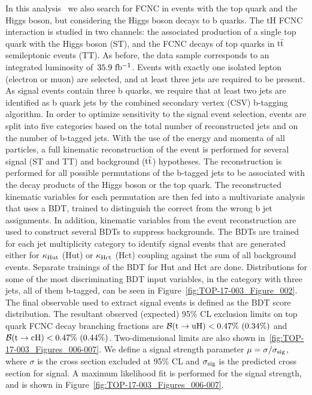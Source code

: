 \documentclass{PoS}
\begin{document}
In this analysis~\cite{top-17-003} we also search for FCNC in events with the
top quark and the Higgs boson, but considering the Higgs boson decays to b
quarks. The tH FCNC interaction is studied in two channels: the associated
production of a single top quark with the Higgs boson (ST), and the FCNC decays
of top quarks in ${\rm t{\bar t}}$ semileptonic events (TT). As before, the data
sample corresponds to an integrated luminosity of~${\rm 35.9~fb^{-1}}$. Events
with exactly one isolated lepton (electron or muon) are selected, and at least
three jets are required to be present. As signal events contain three b quarks,
we require that at least two jets are identified as b quark jets by the combined
secondary vertex (CSV) b-tagging algorithm. In order to optimize sensitivity to
the signal event selection, events are split into five categories based on the
total number of reconstructed jets and on the number of b-tagged jets. With the
use of the energy and momenta of all particles, a full kinematic reconstruction
of the event is performed for several signal (ST and TT) and background
(${\rm t{\bar t}}$) hypotheses. The reconstruction is performed for all possible
permutations of the b-tagged jets to be associated with the decay products of
the Higgs boson or the top quark. The reconstructed kinematic variables for each
permutation are then fed  into a multivariate analysis that uses a BDT, trained
to distinguish the correct from the wrong b jet assignments. In addition,
kinematic variables from the event reconstruction are used to construct several
BDTs to suppress backgrounds. The BDTs are trained for each jet multiplicity
category to identify signal events that are generated either for
${\rm \kappa_{Hut}}$ (Hut) or ${\rm \kappa_{Hct}}$ (Hct) coupling against the
sum of all background events. Separate trainings of the BDT for Hut and Hct are
done. Distributions for some of the most discriminating BDT input variables,
in the category with three jets, all of them b-tagged, can be seen in
Figure~\ref{fig:TOP-17-003_Figure_002}. The final observable used to extract
signal events is defined as the BDT score distribution. The resultant observed
(expected) 95\% CL exclusion limits on top quark FCNC decay branching fractions
are ${\cal B}({\rm t \to uH}) < 0.47\%~(0.34\%)$ and
${\cal B}({\rm t \to cH}) < 0.47\%~(0.44\%)$. Two-dimensional limits are also
shown in~\ref{fig:TOP-17-003_Figures_006-007}. We define a signal strength
parameter $\mu = \sigma/\sigma_{\rm sig}$, where $\sigma$ is the cross section
excluded at 95\% CL and $\sigma_{\rm sig}$ is the predicted cross section for
signal. A maximum likelihood fit is performed for the signal strength, and is
shown in Figure~\ref{fig:TOP-17-003_Figures_006-007}.
\end{document}
